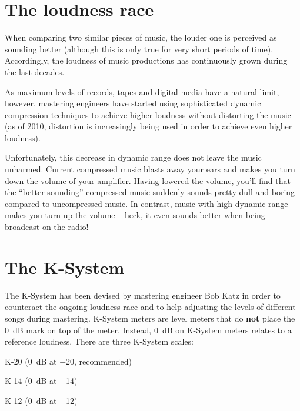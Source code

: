 \maketitle

\tableofcontents

\clearpage  %

\chapter{The loudness race}
\label{chap:loudness_race}

When comparing two similar pieces of music, the louder one is
perceived as sounding better (although this is only true for very
short periods of time).  Accordingly, the loudness of music
productions has continuously grown during the last decades.

As maximum levels of records, tapes and digital media have a natural
limit, however, mastering engineers have started using sophisticated
dynamic compression techniques to achieve higher loudness without
distorting the music (as of 2010, distortion is increasingly being
used in order to achieve even higher loudness).

Unfortunately, this decrease in dynamic range does not leave the music
unharmed.  Current compressed music blasts away your ears and makes
you turn down the volume of your amplifier.  Having lowered the
volume, you'll find that the ``better-sounding'' compressed music
suddenly sounds pretty dull and boring compared to uncompressed music.
In contrast, music with high dynamic range makes you turn up the
volume -- heck, it even sounds better when being broadcast on the
radio!

\chapter{The K-System}
\label{chap:k_system}

The K-System has been devised by mastering engineer Bob Katz in order
to counteract the ongoing loudness race and to help adjusting the
levels of different songs during mastering.  K-System meters are level
meters that do \textbf{not} place the \SI{0}{\dB} mark on top of the
meter.  Instead, \SI{0}{\dB} on K-System meters relates to a reference
loudness.  There are three K-System scales:

\begin{compactitem}
\item K-20 (\SI{0}{\dB} at \SI{-20}{\dBFS}, recommended)
\item K-14 (\SI{0}{\dB} at \SI{-14}{\dBFS})
\item K-12 (\SI{0}{\dB} at \SI{-12}{\dBFS})
\end{compactitem}

